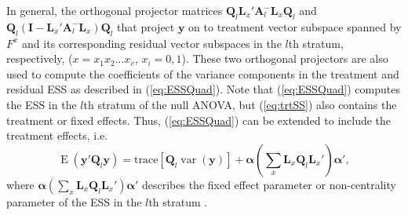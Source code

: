 \documentclass[article]{jss}
\newcommand{\I}{\mathbf{I}}
\newcommand{\Q}{\mathbf{Q}}
\newcommand{\A}{\mathbf{A}}
\newcommand{\mL}{\mathbf{L}}
\begin{document}
In general, the orthogonal projector matrices $\Q_l \mL_{x}' \A_{l}^{-} \mL_{x} \Q_l$ and $\Q_l ( \I -  \mL_{x}' \A_{l}^{-} \mL_{x}) \Q_l$ that project $\bm{y}$ on to treatment vector subspace spanned by $F^x$ and its corresponding residual vector subspaces in the $l$th stratum, respectively, ($x = x_1 x_2 \dots x_{v}$, $x_i = 0,1$). These two orthogonal projectors are also used to compute the coefficients of the variance components in the treatment and residual ESS as described in (\ref{eq:ESSQuad}). Note that (\ref{eq:ESSQuad}) computes the ESS in the $l$th stratum of the null ANOVA, but (\ref{eq:trtSS}) also contains the treatment or fixed effects. Thus, (\ref{eq:ESSQuad}) can be extended to include the treatment effects, i.e.\  
\begin{equation}
\label{eq:ESSQuadTrt}
\operatorname{E}(\bm{y}'\Q_{l}\bm{y})= \mathrm{trace}[\Q_{l}\operatorname{var}(\bm{y})] + \bm{\alpha}\left(\sum_x  \mL_{x}\Q_{l}\mL_{x}'\right)\bm{\alpha}',
\end{equation}
where $\bm{\alpha}\left(\sum_x \mL_{x}\Q_{l}\mL_{x}'\right)\bm{\alpha}'$ describes the fixed effect parameter or non-centrality parameter of the ESS in the $l$th stratum \citep{Searle1982}.
\end{document}
